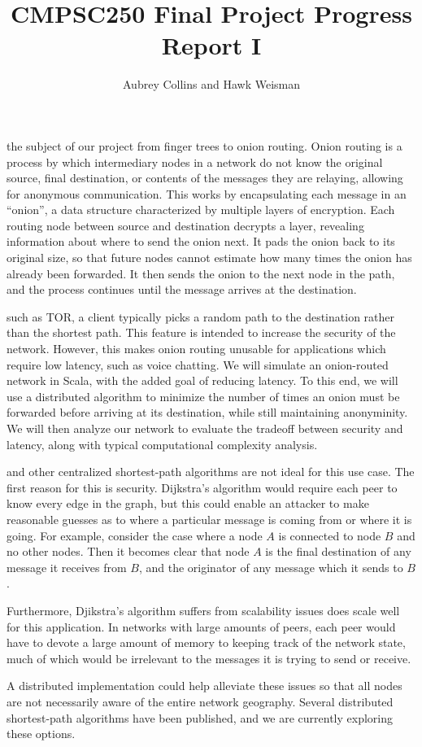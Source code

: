 \documentclass[a4paper,nobib]{tufte-handout}
\title{CMPSC250 Final Project Progress Report I}
\author{Aubrey Collins and Hawk Weisman}
\begin{document}
\maketitle

 the subject of our project from finger trees to onion routing. Onion routing is a process by which intermediary nodes in a network do not know the original source, final destination, or contents of the messages they are relaying, allowing for anonymous communication. This works by encapsulating each message in an ``onion'', a data structure characterized by multiple layers of encryption. Each routing node between source and destination decrypts a layer, revealing information about where to send the onion next. It pads the onion back to its original size, so that future nodes cannot estimate how many times the onion has already been forwarded. It then sends the onion to the next node in the path, and the process continues until the message arrives at the destination.

 such as TOR, a client typically picks a random path to the destination rather than the shortest path. This feature is intended to increase the security of the network. However, this makes onion routing unusable for applications which require low latency, such as voice chatting. We will simulate an onion-routed network in Scala, with the added goal of reducing latency. To this end, we will use a distributed algorithm to minimize the number of times an onion must be forwarded before arriving at its destination, while still maintaining anonyminity. We will then analyze our network to evaluate the tradeoff between security and latency, along with typical computational complexity analysis.


 and other centralized shortest-path algorithms are not ideal for this use case. The first reason for this is security. Dijkstra’s algorithm would require each peer to know every edge in the graph, but this could enable an attacker to make reasonable guesses as to where a particular message is coming from or where it is going. For example, consider the case where a node $A$ is connected to node $B$ and no other nodes. Then it becomes clear that node $A$ is the final destination of any message it receives from $B$, and the originator of any message which it sends to $B$.

Furthermore, Djikstra's algorithm suffers from scalability issues does scale well for this application. In networks with large amounts of peers, each peer would have to devote a large amount of memory to keeping track of the network state, much of which would be irrelevant to the messages it is trying to send or receive.

A distributed implementation could help alleviate these issues so that all nodes are not necessarily aware of the entire network geography. Several distributed shortest-path algorithms have been published, and we are currently exploring these options.
\end{document}
